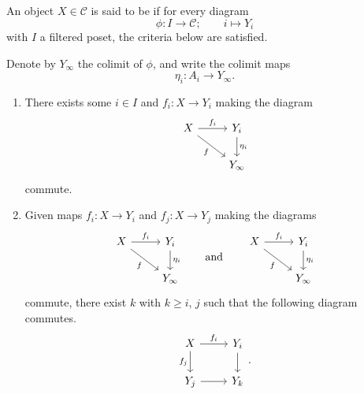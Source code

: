 \documentclass[main.tex]{subfiles}
\begin{document}
\begin{definition}
  \label{def:compact_object}
  An object $X \in \mathcal{C}$ is said to be  if for every diagram
  \begin{equation*}
    \phi\colon I \to \mathcal{C};\qquad i \mapsto Y_{i}
  \end{equation*}
  with $I$ a filtered poset, the criteria below are satisfied.

  Denote by $Y_{\infty}$ the colimit of $\phi$, and write the colimit maps
  \begin{equation*}
    \eta_{i}\colon A_{i} \to Y_{\infty}.
  \end{equation*}

  \begin{enumerate}
    \item There exists some $i \in I$ and $f_{i}\colon X \to Y_{i}$ making the diagram
      \begin{equation*}
        \begin{tikzcd}
          X
          \arrow[r, "f_{i}"]
          \arrow[dr, swap, "f"]
          & Y_{i}
          \arrow[d, "\eta_{i}"]
          \\
          & Y_{\infty}
        \end{tikzcd}
      \end{equation*}
      commute.

    \item Given maps $f_{i}\colon X \to Y_{i}$ and $f_{j}\colon X \to Y_{j}$ making the diagrams
      \begin{equation*}
        \begin{tikzcd}
          X
          \arrow[r, "f_{i}"]
          \arrow[dr, swap, "f"]
          & Y_{i}
          \arrow[d, "\eta_{i}"]
          \\
          & Y_{\infty}
        \end{tikzcd}
        \qquad\text{and}\qquad
        \begin{tikzcd}
          X
          \arrow[r, "f_{i}"]
          \arrow[dr, swap, "f"]
          & Y_{i}
          \arrow[d, "\eta_{i}"]
          \\
          & Y_{\infty}
        \end{tikzcd}
      \end{equation*}
      commute, there exist $k$ with $k \geq i$, $j$ such that the following diagram commutes.
      \begin{equation*}
        \begin{tikzcd}
          X
          \arrow[r, "f_{i}"]
          \arrow[d, swap, "f_{j}"]
          & Y_{i}
          \arrow[d]
          \\
          Y_{j}
          \arrow[r]
          & Y_{k}
        \end{tikzcd}.
      \end{equation*}
  \end{enumerate}
\end{definition}
\end{document}
